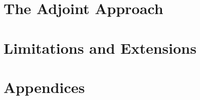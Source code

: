 \documentclass[12pt]{book}
\begin{document}


\part{The Adjoint Approach}





\part{Limitations and Extensions}




\appendix

\part*{Appendices}







\backmatter




\printindex
\end{document}
